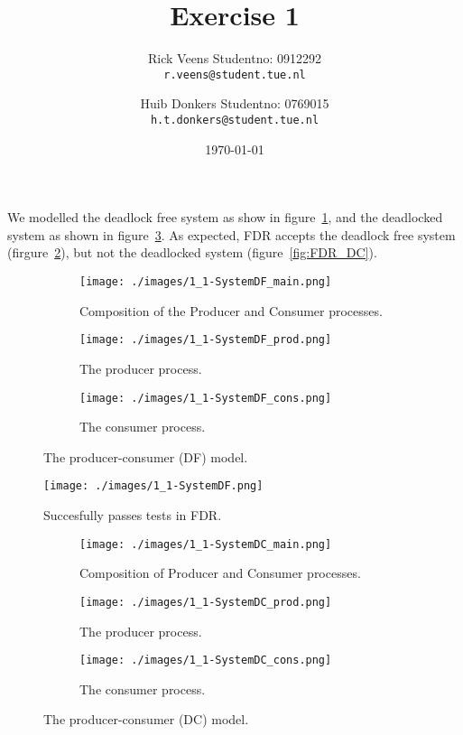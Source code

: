 \documentclass[a4paper,twoside,11pt]{article}
\title{\vspace{-\baselineskip}\sffamily\bfseries Exercise 1}
\author{
	Rick Veens \qquad Studentno: 0912292\\
	\texttt{r.veens@student.tue.nl}
	\and
	Huib Donkers \qquad Studentno: 0769015\\
	\texttt{h.t.donkers@student.tue.nl}
}
\date{\today}
\begin{document}
\maketitle

\section{}
\subsection{}
\subsubsection{}
We modelled the deadlock free system as show in figure~\ref{fig:SystemDF}, and the deadlocked system as shown in figure~\ref{fig:SystemDC}. As expected, FDR accepts the deadlock free system (firgure~\ref{fig:FDR_DF}), but not the deadlocked system (figure~\ref{fig:FDR_DC}).
\begin{figure}
 \centering
 \begin{subfigure}{\textwidth}
  \centering
  \texttt{[image: ./images/1\_1-SystemDF\_main.png]}
  \caption{Composition of the Producer and Consumer processes.}
 \end{subfigure}
 \begin{subfigure}{0.5\textwidth}
  \centering
	\texttt{[image: ./images/1\_1-SystemDF\_prod.png]}
	\caption{The producer process.}
 \end{subfigure}%
 \begin{subfigure}{0.5\textwidth}
  \centering
	\texttt{[image: ./images/1\_1-SystemDF\_cons.png]}
	\caption{The consumer process.}
 \end{subfigure}
 \caption{The producer-consumer (DF) model.}
 \label{fig:SystemDF}
\end{figure}

\begin{figure}
 \centering
 \texttt{[image: ./images/1\_1-SystemDF.png]}
 \caption{Succesfully passes tests in FDR.}
 \label{fig:FDR_DF}
\end{figure}


\begin{figure}
 \centering
 \begin{subfigure}{\textwidth}
  \centering
  \texttt{[image: ./images/1\_1-SystemDC\_main.png]}
  \caption{Composition of Producer and Consumer processes.}
 \end{subfigure}
 \begin{subfigure}{0.5\textwidth}
  \centering
	\texttt{[image: ./images/1\_1-SystemDC\_prod.png]}
	\caption{The producer process.}
 \end{subfigure}%
 \begin{subfigure}{0.5\textwidth}
  \centering
	\texttt{[image: ./images/1\_1-SystemDC\_cons.png]}
	\caption{The consumer process.}
 \end{subfigure}
  \caption{The producer-consumer (DC) model.}
  \label{fig:SystemDC}
\end{figure}
\end{document}
